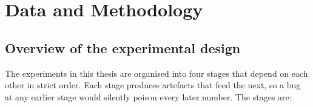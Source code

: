 \cleardoubleoddpage
\chapter{Data and Methodology}
\label{chap:data-methodology}



\section{Overview of the experimental design}
\label{sec:methodology-overview}

The experiments in this thesis are organised into four stages that
depend on each other in strict order. Each stage produces artefacts
that feed the next, so a bug at any earlier stage would silently
poison every later number. The stages are:

